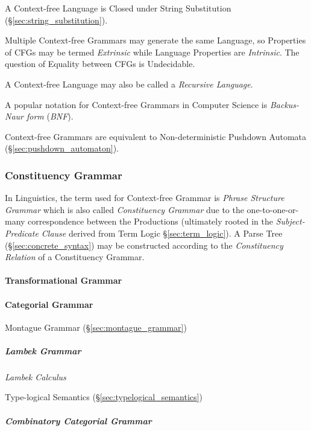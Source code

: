 A Context-free Language is Closed under String Substitution
(\S\ref{sec:string_substitution}).

Multiple Context-free Grammars may generate the same Language, so
Properties of CFGs may be termed \emph{Extrinsic} while Language
Properties are \emph{Intrinsic}. The question of Equality between CFGs
is Undecidable.

A Context-free Language may also be called a \emph{Recursive
  Language}.

A popular notation for Context-free Grammars in Computer Science is
\emph{Backus-Naur form} (\emph{BNF}).

Context-free Grammars are equivalent to Non-deterministic Pushdown
Automata (\S\ref{sec:pushdown_automaton}).



\subsubsection{Constituency Grammar}\label{sec:constituency_grammar}

In Linguistics, the term used for Context-free Grammar is \emph{Phrase
  Structure Grammar} which is also called \emph{Constituency Grammar}
due to the one-to-one-or-many correspondence between the Productions
(ultimately rooted in the \emph{Subject-Predicate Clause} derived from
Term Logic \S\ref{sec:term_logic}). A Parse Tree
(\S\ref{sec:concrete_syntax}) may be constructed according to the
\emph{Constituency Relation} of a Constituency Grammar.



\paragraph{Transformational Grammar}\label{sec:transformational_grammar}



\paragraph{Categorial Grammar}\label{sec:categorial_grammar}

Montague Grammar (\S\ref{sec:montague_grammar})

\subparagraph{Lambek Grammar}\label{sec:lambek_grammar}

\emph{Lambek Calculus}

Type-logical Semantics (\S\ref{sec:typelogical_semantics})

\subparagraph{Combinatory Categorial Grammar}
\label{sec:combinatory_categorial}



